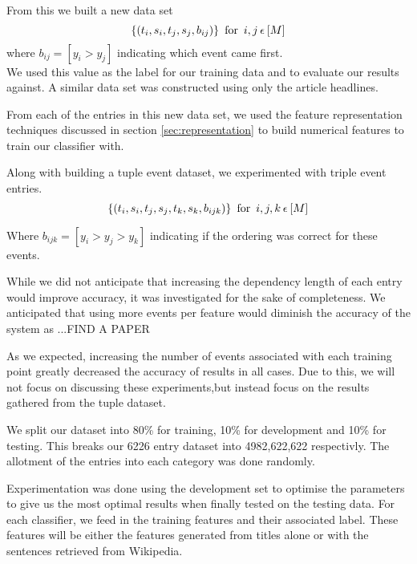 \documentclass[bsc,frontabs,twoside,singlespacing,parskip,deptreport]{infthesis}     %
\begin{document}
    From this we built a new data set
    \begin{equation}
      \{(t_{i},s_{i},t_{j},s_{j},b_{ij})\} \hspace{0.5em} \text{for} \hspace{0.5em} i,j \hspace{0.2em}\epsilon \hspace{0.2em}[M]\nonumber
    \end{equation}
    where $b_{ij} = [y_{i} > y_{j}]$ indicating which event came first.\\
    We used this value as the label for our training data and to evaluate our results against.
    A similar data set was constructed using only the article headlines.
    
    From each of the entries in this new data set, we used the feature representation techniques discussed in section \ref{sec:representation} to build numerical
    features to train our classifier with.

Along with building a tuple event dataset, we experimented with triple event entries.
\begin{equation}
      \{(t_{i},s_{i},t_{j},s_{j},t_{k},s_{k},b_{ijk})\} \hspace{0.5em} \text{for} \hspace{0.5em} i,j,k \hspace{0.2em}\epsilon \hspace{0.2em}[M]\nonumber
\end{equation}

Where $b_{ijk} = [y_i > y_j > y_k]$ indicating if the ordering was correct for these events.

While we did not anticipate that increasing the dependency length of each entry would improve accuracy, it was investigated
for the sake of completeness. We anticipated that using more events per feature would diminish the accuracy of the system as
...FIND A PAPER

As we expected, increasing the number of events associated with each training point greatly decreased the accuracy of results in all cases.
Due to this, we will not focus on discussing these experiments,but instead focus on the results gathered from the tuple dataset.

We split our dataset into 80\% for training, 10\% for development and 10\% for testing.
This breaks our 6226 entry dataset into 4982,622,622 respectivly.
The allotment of the entries into each category was done randomly.

Experimentation was done using the development set to optimise the parameters to give us the most optimal results
when finally tested on the testing data.
For each classifier, we feed in the training features and their associated label. These features will
be either the features generated from titles alone or with the sentences retrieved from Wikipedia.
\end{document}
